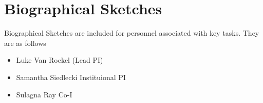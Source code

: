 \section{Biographical Sketches}
\label{sec:cvs}

Biographical Sketches are included for personnel associated with key tasks.  They are as follows

\begin{itemize}
\item Luke Van Roekel (Lead PI)
\item Samantha Siedlecki {Instituional PI}
\item Sulagna Ray {Co-I}
\end{itemize}

\newpage

\newpage

\newpage

\newpage